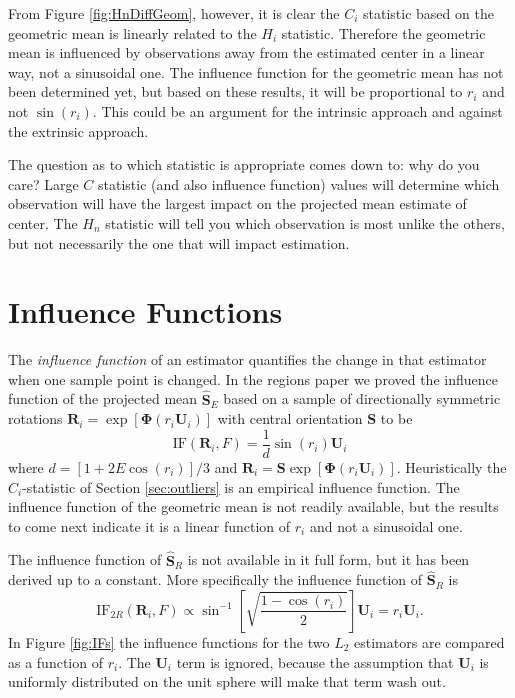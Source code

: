 \documentclass{article}\usepackage[]{graphicx}\usepackage[]{color}
\newcommand{\ProjMean}{{\widehat{\bm S}_{E}}}
\newcommand{\GeomMean}{{\widehat{\bm S}_{R}}}
\begin{document}
From Figure \ref{fig:HnDiffGeom}, however, it is clear the $C_i$ statistic based on the geometric mean is linearly related to the $H_i$ statistic.  Therefore the geometric mean is influenced by observations away from the estimated center in a linear way, not a sinusoidal one.  The influence function for the geometric mean has not been determined yet, but based on these results, it will be proportional to $r_i$ and not $\sin(r_i)$.  This could be an argument for the intrinsic approach and against the extrinsic approach.


The question as to which statistic is appropriate comes down to: why do you care?  Large $C$ statistic (and also influence function) values will determine which observation will have the largest impact on the projected mean estimate of center.  The $H_n$ statistic will tell you which observation is most unlike the others, but not necessarily the one that will impact estimation.

\section{Influence Functions}\label{sec:ifs}

The \emph{influence function} of an estimator quantifies the change in that estimator when one sample point is changed.  In the regions paper we proved the influence function of the projected mean $\ProjMean$ based on a sample of directionally symmetric rotations $\bm R_i=\exp[\bm \Phi(r_i\bm U_i)]$ with central orientation $\bm S$ to be
\begin{equation}\label{eqn:IF}
\text{IF}(\bm R_i,F)=\frac{1}{d}\sin(r_i)\bm U_i
\end{equation}
where $d=[1+2E\cos(r_i)]/3$ and $\bm R_i=\bm S\exp[\bm\Phi(r_i\bm U_i)]$.  Heuristically the $C_i$-statistic of Section \ref{sec:outliers} is an empirical influence function.  The influence function of the geometric mean is not readily available, but the results to come next indicate it is a linear function of $r_i$ and not a sinusoidal one.

The influence function of $\GeomMean$ is not available in it full form, but it has been derived up to a constant.  More specifically the influence function of $\GeomMean$ is
\[
\text{IF}_{2R}(\bm R_i,F)\propto\sin^{-1}\left[\sqrt{\frac{1-\cos(r_i)}{2}}\right]\bm U_i= r_i\bm U_i.
\]
In Figure \ref{fig:IFs} the influence functions for the two $L_2$ estimators are compared as a function of $r_i$.  The $\bm U_i$ term is ignored, because the assumption that $\bm U_i$ is uniformly distributed on the unit sphere will make that term wash out.
 
\end{document}
